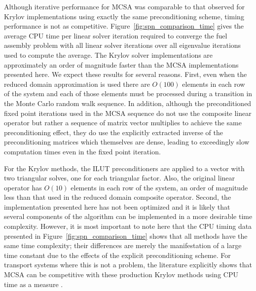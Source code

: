Although iterative performance for MCSA was comparable to that
observed for Krylov implementations using exactly the same
preconditioning scheme, timing performance is not as
competitive. Figure~\ref{fig:spn_comparison_time} gives the average
CPU time per linear solver iteration required to converge the fuel
assembly problem with all linear solver iterations over all eigenvalue
iterations used to compute the average. The Krylov solver
implementations are approximately an order of magnitude faster than
the MCSA implementations presented here. We expect these results for
several reasons. First, even when the reduced domain approximation is
used there are $O(100)$ elements in each row of the system and each of
those elements must be processed during a transition in the Monte
Carlo random walk sequence. In addition, although the preconditioned
fixed point iterations used in the MCSA sequence do not use the
composite linear operator but rather a sequence of matrix vector
multiplies to achieve the same preconditioning effect, they do use the
explicitly extracted inverse of the preconditioning matrices which
themselves are dense, leading to exceedingly slow computation times
even in the fixed point iteration.

For the Krylov methods, the ILUT preconditioners are applied to a
vector with two triangular solves, one for each triangular
factor. Also, the original linear operator has $O(10)$ elements in
each row of the system, an order of magnitude less than that used in
the reduced domain composite operator. Second, the implementation
presented here has not been optimized and it is likely that several
components of the algorithm can be implemented in a more desirable
time complexity. However, it is most important to note here that the
CPU timing data presented in Figure~\ref{fig:spn_comparison_time}
shows that all methods have the same time complexity; their
differences are merely the manifestation of a large time constant due
to the effects of the explicit preconditioning scheme. For transport
systems where this is not a problem, the literature explicitly shows
that MCSA can be competitive with these production Krylov methods
using CPU time as a measure \cite{evans_monte_2012}.

